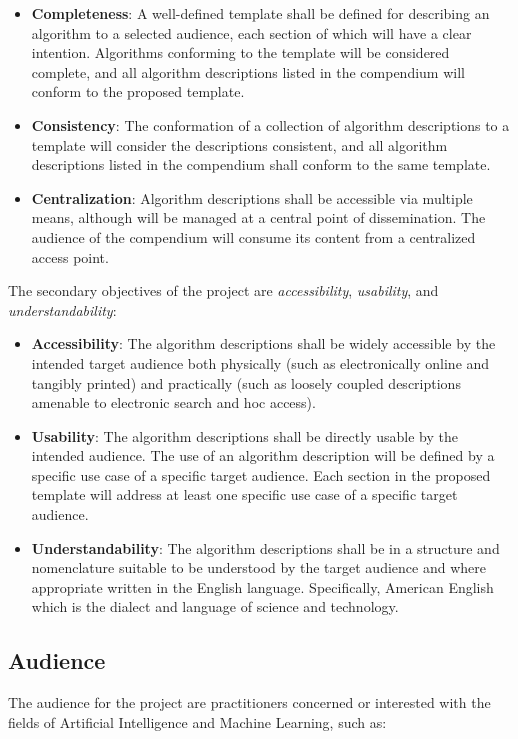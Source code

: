 \documentclass[a4paper, 11pt]{article}
\begin{document}
\begin{itemize}
	\item \textbf{Completeness}: A well-defined template shall be defined for describing an algorithm to a selected audience, each section of which will have a clear intention. Algorithms conforming to the template will be considered complete, and all algorithm descriptions listed in the compendium will conform to the proposed template.
	\item \textbf{Consistency}: The conformation of a collection of algorithm descriptions to a template will consider the descriptions consistent, and all algorithm descriptions listed in the compendium shall conform to the same template.
	\item \textbf{Centralization}: Algorithm descriptions shall be accessible via multiple means, although will be managed at a central point of dissemination. The audience of the compendium will consume its content from a centralized access point.
\end{itemize}

The secondary objectives of the project are \emph{accessibility}, \emph{usability}, and \emph{understandability}:

\begin{itemize}
	\item \textbf{Accessibility}: The algorithm descriptions shall be widely accessible by the intended target audience both physically (such as electronically online and tangibly printed) and practically (such as loosely coupled descriptions amenable to electronic search and hoc access).
	\item \textbf{Usability}: The algorithm descriptions shall be directly usable by the intended audience. The use of an algorithm description will be defined by a specific use case of a specific target audience. Each section in the proposed template will address at least one specific use case of a specific target audience.
	\item \textbf{Understandability}: The algorithm descriptions shall be in a structure and nomenclature suitable to be understood by the target audience and where appropriate written in the English language. Specifically, American English which is the dialect and language of science and technology.
\end{itemize}

\subsection{Audience}
The audience for the project are practitioners concerned or interested with the fields of Artificial Intelligence and Machine Learning, such as:
\end{document}

